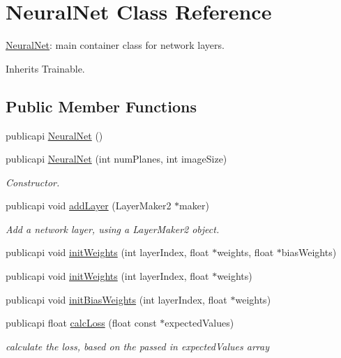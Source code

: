 \hypertarget{classNeuralNet}{\section{Neural\-Net Class Reference}
\label{classNeuralNet}
}


\hyperlink{classNeuralNet}{Neural\-Net}\-: main container class for network layers.  




Inherits Trainable.

\subsection*{Public Member Functions}
\begin{DoxyCompactItemize}
\item 
publicapi \hyperlink{classNeuralNet_a26e76270c8d49f4580909c07cb3595e8}{Neural\-Net} ()
\item 
publicapi \hyperlink{classNeuralNet_a4103bdf505370eb0e95a895844baa2c2}{Neural\-Net} (int num\-Planes, int image\-Size)
\begin{DoxyCompactList}\small\item\em Constructor. \end{DoxyCompactList}\item 
publicapi void \hyperlink{classNeuralNet_ada3ed198a3be790c3ef778f389912253}{add\-Layer} (Layer\-Maker2 $\ast$maker)
\begin{DoxyCompactList}\small\item\em Add a network layer, using a Layer\-Maker2 object. \end{DoxyCompactList}\item 
publicapi void \hyperlink{classNeuralNet_a21ee7f451c902841af4e982ed6778f9c}{init\-Weights} (int layer\-Index, float $\ast$weights, float $\ast$bias\-Weights)
\item 
publicapi void \hyperlink{classNeuralNet_a254fcda33e374b004ea4bd2b89d27ca7}{init\-Weights} (int layer\-Index, float $\ast$weights)
\item 
publicapi void \hyperlink{classNeuralNet_a7d0a31fc104af25ec31587545243e794}{init\-Bias\-Weights} (int layer\-Index, float $\ast$weights)
\item 
publicapi float \hyperlink{classNeuralNet_a385e6db3f7614d2867f9d859ddf21cd4}{calc\-Loss} (float const $\ast$expected\-Values)
\begin{DoxyCompactList}\small\item\em calculate the loss, based on the passed in expected\-Values array \end{DoxyCompactList}\item 

\end{DoxyCompactItemize}

